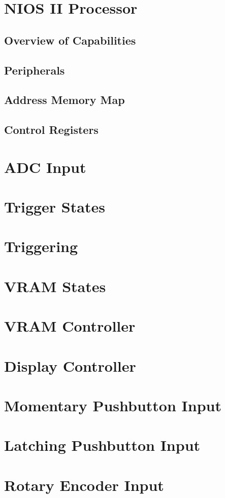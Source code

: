 \section{NIOS II Processor}

\subsection{Overview of Capabilities}

\subsection{Peripherals}

\subsection{Address Memory Map}

\subsection{Control Registers}

\section{ADC Input}

\section{Trigger States}

\section{Triggering}

\section{VRAM States}

\section{VRAM Controller}

\section{Display Controller}

\section{Momentary Pushbutton Input}

\section{Latching Pushbutton Input}

\section{Rotary Encoder Input}

